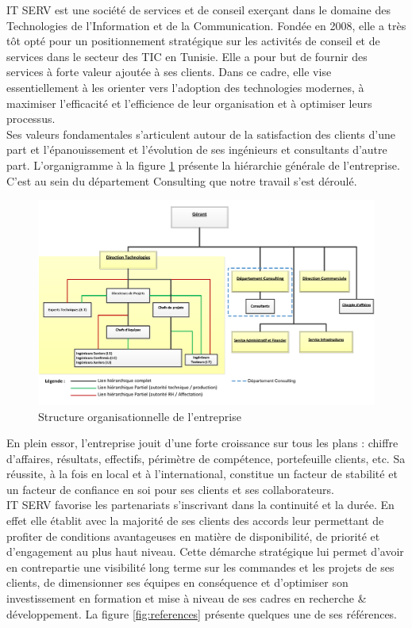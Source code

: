 \begin{spacing}{1.5}
IT SERV est une société de services et de conseil exerçant dans le domaine des Technologies de l'Information et de la Communication.
Fondée en 2008, elle a très tôt opté pour un positionnement stratégique sur les activités de conseil et de services dans le secteur des TIC en Tunisie. Elle a pour but de fournir des services à forte valeur ajoutée à ses clients. Dans ce cadre, elle vise essentiellement à les orienter vers l'adoption des technologies modernes, à maximiser l'efficacité et l'efficience de leur organisation et à optimiser leurs processus.\\
Ses valeurs fondamentales s'articulent autour de la satisfaction des clients d'une part et l'épanouissement et l'évolution de ses ingénieurs et consultants d'autre part. L'organigramme à la figure \ref{fig:organigramme} présente la hiérarchie générale de l'entreprise. C'est au sein du département Consulting que notre travail s'est déroulé.\\

\begin{figure}[h]
\centering
\includegraphics[width=1\linewidth]{organigramme.png}
\caption{Structure organisationnelle de l'entreprise}
\label{fig:organigramme}
\end{figure}

En plein essor, l'entreprise jouit d'une forte croissance sur tous les plans : chiffre d'affaires, résultats, effectifs, périmètre de compétence, portefeuille clients, etc. Sa réussite, à la fois en local et à l'international, constitue un facteur de stabilité et un facteur de confiance en soi pour ses clients et ses collaborateurs.\\

IT SERV favorise les partenariats s'inscrivant dans la continuité et la durée. En effet elle établit avec la majorité de ses clients des accords leur permettant de profiter de conditions avantageuses en matière de disponibilité, de priorité et d'engagement au plus haut niveau. Cette démarche stratégique lui permet d'avoir en contrepartie une visibilité long terme sur les commandes et les projets de ses clients, de dimensionner ses équipes en conséquence et d'optimiser son investissement en formation et mise à niveau de ses cadres en recherche \& développement. La figure \ref{fig:references} présente quelques une de ses références.


\end{spacing}
